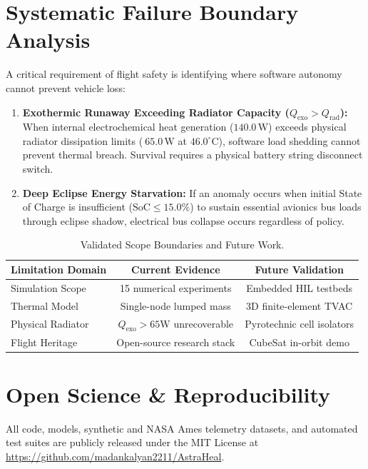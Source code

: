 \documentclass[10pt,twocolumn]{article}
\begin{document}
\section{Systematic Failure Boundary Analysis}
A critical requirement of flight safety is identifying where software autonomy cannot prevent vehicle loss:
\begin{enumerate}
    \item \textbf{Exothermic Runaway Exceeding Radiator Capacity ($Q_{\text{exo}} > Q_{\text{rad}}$):} When internal electrochemical heat generation ($140.0\,\text{W}$) exceeds physical radiator dissipation limits ($~65.0\,\text{W}$ at $46.0^\circ\text{C}$), software load shedding cannot prevent thermal breach. Survival requires a physical battery string disconnect switch.
    \item \textbf{Deep Eclipse Energy Starvation:} If an anomaly occurs when initial State of Charge is insufficient ($\text{SoC} \le 15.0\%$) to sustain essential avionics bus loads through eclipse shadow, electrical bus collapse occurs regardless of policy.
\end{enumerate}

\begin{table}[t]
\centering
\caption{Validated Scope Boundaries and Future Work.}
\label{tab:scope}
\small
\setlength{\tabcolsep}{5pt}
\renewcommand{\arraystretch}{1.15}
\begin{tabular}{lcc}
\toprule
\textbf{Limitation Domain} & \textbf{Current Evidence} & \textbf{Future Validation} \\
\midrule
Simulation Scope & 15 numerical experiments & Embedded HIL testbeds \\
Thermal Model & Single-node lumped mass & 3D finite-element TVAC \\
Physical Radiator & $Q_{\text{exo}} > 65\text{W}$ unrecoverable & Pyrotechnic cell isolators \\
Flight Heritage & Open-source research stack & CubeSat in-orbit demo \\
\bottomrule
\end{tabular}
\end{table}

\section{Open Science \& Reproducibility}
All code, models, synthetic and NASA Ames telemetry datasets, and automated test suites are publicly released under the MIT License at \url{https://github.com/madankalyan2211/AstraHeal}.
\end{document}
